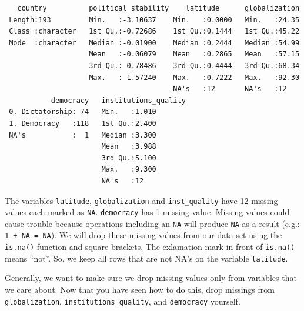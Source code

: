\documentclass[]{article}
\newenvironment{Shaded}{\begin{snugshade}}{\end{snugshade}}
\newcommand{\KeywordTok}[1]{\textcolor[rgb]{0.13,0.29,0.53}{\textbf{#1}}}
\newcommand{\StringTok}[1]{\textcolor[rgb]{0.31,0.60,0.02}{#1}}
\newcommand{\OperatorTok}[1]{\textcolor[rgb]{0.81,0.36,0.00}{\textbf{#1}}}
\newcommand{\NormalTok}[1]{#1}
\theoremstyle{definition}
\theoremstyle{definition}
\theoremstyle{definition}
\theoremstyle{remark}
\begin{document}
\begin{verbatim}
   country          political_stability    latitude      globalization  
 Length:193         Min.   :-3.10637    Min.   :0.0000   Min.   :24.35  
 Class :character   1st Qu.:-0.72686    1st Qu.:0.1444   1st Qu.:45.22  
 Mode  :character   Median :-0.01900    Median :0.2444   Median :54.99  
                    Mean   :-0.06079    Mean   :0.2865   Mean   :57.15  
                    3rd Qu.: 0.78486    3rd Qu.:0.4444   3rd Qu.:68.34  
                    Max.   : 1.57240    Max.   :0.7222   Max.   :92.30  
                                        NA's   :12       NA's   :12     
           democracy   institutions_quality
 0. Dictatorship: 74   Min.   :1.010       
 1. Democracy   :118   1st Qu.:2.400       
 NA's           :  1   Median :3.300       
                       Mean   :3.988       
                       3rd Qu.:5.100       
                       Max.   :9.300       
                       NA's   :12          
\end{verbatim}

The variables \texttt{latitude}, \texttt{globalization} and
\texttt{inst\_quality} have 12 missing values each marked as
\texttt{NA}. \texttt{democracy} has 1 missing value. Missing values
could cause trouble because operations including an \texttt{NA} will
produce \texttt{NA} as a result (e.g.: \texttt{1\ +\ NA\ =\ NA}). We
will drop these missing values from our data set using the
\texttt{is.na()} function and square brackets. The exlamation mark in
front of \texttt{is.na()} means ``not''. So, we keep all rows that are
not NA's on the variable \texttt{latitude}.

\begin{Shaded}
\end{Shaded}

Generally, we want to make sure we drop missing values only from
variables that we care about. Now that you have seen how to do this,
drop missings from \texttt{globalization},
\texttt{institutions\_quality}, and \texttt{democracy} yourself.

\begin{Shaded}
\end{Shaded}
\end{document}
